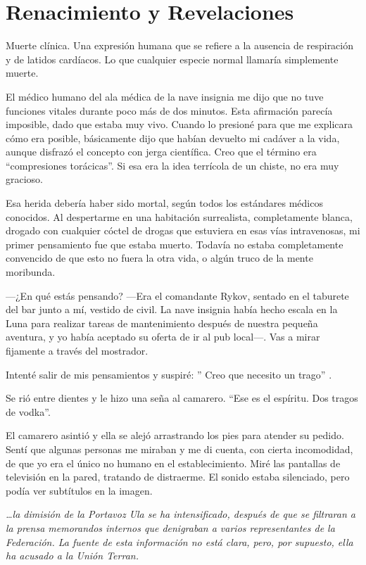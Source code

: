 \chapter{Renacimiento y Revelaciones}\label{sec:renacimiento-y-revelaciones}

Muerte clínica. Una expresión humana que se refiere a la ausencia de respiración y de latidos cardíacos. Lo que cualquier especie normal llamaría simplemente muerte.

El médico humano del ala médica de la nave insignia me dijo que no tuve funciones vitales durante poco más de dos minutos. Esta afirmación parecía imposible, dado que estaba muy vivo. Cuando lo presioné para que me explicara cómo era posible, básicamente dijo que habían devuelto mi cadáver a la vida, aunque disfrazó el concepto con jerga científica. Creo que el término era ``compresiones torácicas''. Si esa era la idea terrícola de un chiste, no era muy gracioso.

Esa herida debería haber sido mortal, según todos los estándares médicos conocidos. Al despertarme en una habitación surrealista, completamente blanca, drogado con cualquier cóctel de drogas que estuviera en esas vías intravenosas, mi primer pensamiento fue que estaba muerto. Todavía no estaba completamente convencido de que esto no fuera la otra vida, o algún truco de la mente moribunda.

—¿En qué estás pensando? —Era el comandante Rykov, sentado en el taburete del bar junto a mí, vestido de civil. La nave insignia había hecho escala en la Luna para realizar tareas de mantenimiento después de nuestra pequeña aventura, y yo había aceptado su oferta de ir al pub local—. Vas a mirar fijamente a través del mostrador.

Intenté salir de mis pensamientos y suspiré: ''
Creo que necesito un trago''
.

Se rió entre dientes y le hizo una seña al camarero. ``Ese es el espíritu. Dos tragos de vodka''.

El camarero asintió y ella se alejó arrastrando los pies para atender su pedido. Sentí que algunas personas me miraban y me di cuenta, con cierta incomodidad, de que yo era el único no humano en el establecimiento. Miré las pantallas de televisión en la pared, tratando de distraerme. El sonido estaba silenciado, pero podía ver subtítulos en la imagen.

\textit{…la dimisión de la Portavoz Ula se ha intensificado, después de que se filtraran a la prensa memorandos internos que denigraban a varios representantes de la Federación. La fuente de esta información no está clara, pero, por supuesto, ella ha acusado a la Unión Terran.}

